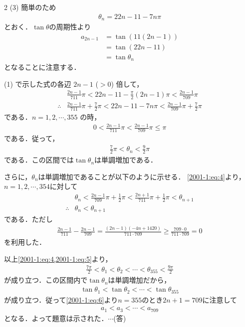 \documentclass[../../main.tex]{subfiles}
\begin{document}
\begin{multicols}{2}
  \vspace{10pt}
  (3)
  簡単のため
  \begin{align*}
    \theta_n = 22n-11-7n\pi
  \end{align*}
  とおく．$\tan\theta$の周期性より
  \begin{align}
    a_{2n-1}
     & = \tan\left(11(2n-1)\right)        \\
     & = \tan\left(22n-11\right)          \\
     & = \tan\theta_n \label{2001-1:eq:6}
  \end{align}
  となることに注意する．

  (1) で示した式の各辺 $2n-1$ ($>0$) 倍して，
  \begin{align}
     & \frac{2n-1}{711}\pi < 22n-11 - \frac{\pi}{2}(2n-1)\pi < \frac{2n-1}{709}\pi  \nonumber                           \\
    \therefore
     & \frac{2n-1}{711}\pi + \frac{7}{2}\pi < 22n-11 - 7n\pi < \frac{2n-1}{709}\pi + \frac{7}{2}\pi \label{2001-1:eq:4}
  \end{align}
  である．$n=1,2,\cdots,355$ の時，
  \begin{align*}
    0 < \frac{2n-1}{711}\pi < \frac{2n-1}{709}\pi \le \pi
  \end{align*}
  である．従って，
  \begin{align*}
    \frac{7}{2}\pi<\theta_n<\frac{9}{2}\pi
  \end{align*}
  である．この区間では$\tan\theta_n$は単調増加である．

  さらに，$\theta_n$は単調増加であることが以下のように示せる．
  \cref{2001-1:eq:4}より，$n=1,2,\cdots,354$に対して
  \begin{align}
     & \theta_n < \frac{2n-1}{709}\pi + \frac{1}{2}\pi < \frac{2n+1}{711}\pi + \frac{1}{2}\pi < \theta_{n+1} \nonumber \\
    \therefore
     & \theta_n < \theta_{n+1} \label{2001-1:eq:5}
  \end{align}
  である．ただし
  \begin{align*}
    \frac{2n-1}{711} - \frac{2n-1}{709} = \frac{(2n-1)(-4n+1420)}{711 \cdot 709} \ge \frac{709 \cdot 0}{711 \cdot 709} = 0
  \end{align*}
  を利用した．

  以上\cref{2001-1:eq:4,2001-1:eq:5}より，
  \begin{align*}
    \frac{7\pi}{2} < \theta_1 < \theta_2 < \cdots < \theta_{355} < \frac{9\pi}{2}
  \end{align*}
  が成り立つ．この区間内で$\tan\theta_n$は単調増加だから，
  \begin{align*}
    \tan \theta_1 < \tan \theta_2 < \cdots < \tan \theta_{355}
  \end{align*}
  が成り立つ．従って\cref{2001-1:eq:6}より$n=355$のとき$2n+1=709$に注意して
  \begin{align*}
    a_1 < a_3 < \cdots < a_{709}
  \end{align*}
  となる．よって題意は示された．$\cdots$(答)


\end{multicols}
\end{document}
